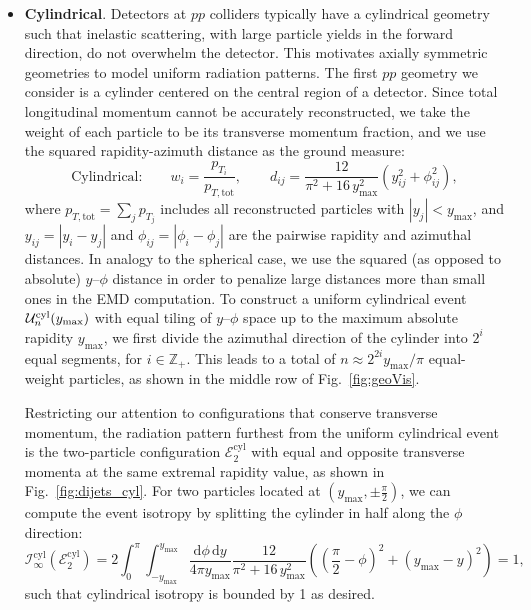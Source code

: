 \documentclass[letterpaper,11pt]{article}
\newcommand{\iso}[2]{\mathcal{I}^\text{#1}_{#2}}
\DeclareRobustCommand{\Fig}[1]{Fig.~\ref{#1}}
\begin{document}
\begin{itemize}
\item \textbf{Cylindrical}.   Detectors at $pp$ colliders typically have a cylindrical geometry such that inelastic scattering, with large particle yields in the forward direction, do not overwhelm the detector. 
%
This motivates axially symmetric geometries to model uniform radiation patterns.
%
The first $pp$ geometry we consider is a cylinder centered on the central region of a detector.
%
Since total longitudinal momentum cannot be accurately reconstructed, we take the weight of each particle to be its transverse momentum fraction, and we use the squared rapidity-azimuth distance as the ground measure:
%
\begin{equation}
\label{eq:cylindrical_metric}
\boxed{\text{Cylindrical:}} \qquad  w_i = \frac{p_{T_i}}{p_{T, \text{tot}}}, \qquad d_{ij} = \frac{12}{\pi^2 +16 \, y_\text{max}^2} \left( y_{ij}^2 + \phi_{ij}^2 \right),
\end{equation}
%
where $p_{T, \text{tot}} = \sum_j p_{T_j}$ includes all reconstructed particles with $|y_j| < y_\text{max}$, and $y_{ij} = |y_i - y_j|$ and $\phi_{ij} = |\phi_i -\phi_j|$ are the pairwise rapidity and azimuthal distances.  
%
In analogy to the spherical case, we use the squared (as opposed to absolute) $y$--$\phi$ distance in order to penalize large distances more than small ones in the EMD computation. 
%
To construct a uniform cylindrical event $\mathcal{U}_n^\text{cyl}(y_{\rm max})$ with equal tiling of $y$--$\phi$ space up to the maximum absolute rapidity $y_\text{max}$, we first divide the azimuthal direction of the cylinder into $2^i$ equal segments, for $i \in \mathbb{Z}_+$.
%
This leads to a total of $n \approx 2^{2i} y_\text{max}/\pi$ equal-weight particles, as shown in the middle row of \Fig{fig:geoVis}.


Restricting our attention to configurations that conserve transverse momentum, the radiation pattern furthest from the uniform cylindrical event is the two-particle configuration $\mathcal{E}^\text{cyl}_2$ with equal and opposite transverse momenta at the same extremal rapidity value, as shown in \Fig{fig:dijets_cyl}. 
%
For two particles located at $\left(y_\text{max},\pm \frac{\pi}{2}\right)$, we can compute the event isotropy by splitting the cylinder in half along the $\phi$ direction:
%
\begin{equation}
\iso{cyl}{\infty}( \mathcal{E}^\text{cyl}_2)= 2 \int_{0}^\pi \int_{- y_\text{max}}^{y_\text{max}} \frac{\text{d} \phi \,  \text{d} y}{4\pi y_\text{max}} \frac{12}{\pi^2 + 16 \, y_\text{max}^2}  \left( \left(\frac{\pi}{2}-\phi\right)^2 + \left(y_\text{max}-y\right)^2 \right) = 1,
\end{equation}
%
such that cylindrical isotropy is bounded by 1 as desired.



\end{itemize}
\end{document}
